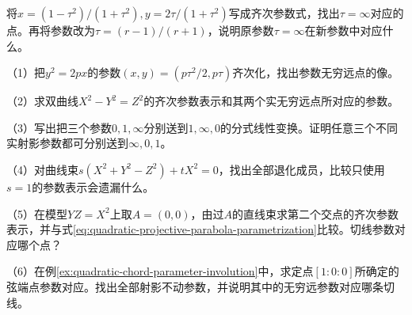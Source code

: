 \par\addvspace{6pt}
\noindent\begin{minipage}{\linewidth}
\begin{example}
将\(x=(1-\tau^2)/(1+\tau^2),y=2\tau/(1+\tau^2)\)写成齐次参数式，找出\(\tau=\infty\)对应的点。再将参数改为\(\tau=(r-1)/(r+1)\)，说明原参数\(\tau=\infty\)在新参数中对应什么。
\end{example}
\end{minipage}\par\addvspace{6pt}

\begin{exercise}
\mbox{}\par\nobreak
\begin{samepage}
（1）把\(y^2=2px\)的参数\((x,y)=(p\tau^2/2,p\tau)\)齐次化，找出参数无穷远点的像。
\par
\end{samepage}

\begin{samepage}
（2）求双曲线\(X^2-Y^2=Z^2\)的齐次参数表示和其两个实无穷远点所对应的参数。
\par
\end{samepage}

\begin{samepage}
（3）写出把三个参数\(0,1,\infty\)分别送到\(1,\infty,0\)的分式线性变换。证明任意三个不同实射影参数都可分别送到\(\infty,0,1\)。
\par
\end{samepage}

\begin{samepage}
（4）对曲线束\(s(X^2+Y^2-Z^2)+tX^2=0\)，找出全部退化成员，比较只使用\(s=1\)的参数表示会遗漏什么。
\par
\end{samepage}

\begin{samepage}
（5）在模型\(YZ=X^2\)上取\(A=(0,0)\)，由过\(A\)的直线束求第二个交点的齐次参数表示，并与式\eqref{eq:quadratic-projective-parabola-parametrization}比较。切线参数对应哪个点？
\par
\end{samepage}

\begin{samepage}
（6）在例\ref{ex:quadratic-chord-parameter-involution}中，求定点\([1:0:0]\)所确定的弦端点参数对应。找出全部射影不动参数，并说明其中的无穷远参数对应哪条切线。
\par
\end{samepage}
\end{exercise}


